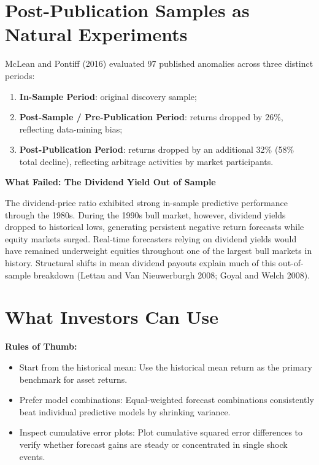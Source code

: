 \section{Post-Publication Samples as Natural Experiments}
\label{sec:05-postpub}

McLean and Pontiff (2016) evaluated 97 published anomalies across three distinct periods:
\begin{enumerate}
  \item \textbf{In-Sample Period}: original discovery sample;
  \item \textbf{Post-Sample / Pre-Publication Period}: returns dropped by 26\%, reflecting data-mining bias;
  \item \textbf{Post-Publication Period}: returns dropped by an additional 32\% (58\% total decline), reflecting arbitrage activities by market participants.
\end{enumerate}

\begin{callout}
\noindent \textbf{What Failed: The Dividend Yield Out of Sample}

The dividend-price ratio exhibited strong in-sample predictive performance through the 1980s. During the 1990s bull market, however, dividend yields dropped to historical lows, generating persistent negative return forecasts while equity markets surged. Real-time forecasters relying on dividend yields would have remained underweight equities throughout one of the largest bull markets in history. Structural shifts in mean dividend payouts explain much of this out-of-sample breakdown (Lettau and Van Nieuwerburgh 2008; Goyal and Welch 2008).
\end{callout}

\section{What Investors Can Use}
\label{sec:05-investors}

\textbf{Rules of Thumb:}
\begin{itemize}
  \item Start from the historical mean: Use the historical mean return as the primary benchmark for asset returns.
  \item Prefer model combinations: Equal-weighted forecast combinations consistently beat individual predictive models by shrinking variance.
  \item Inspect cumulative error plots: Plot cumulative squared error differences to verify whether forecast gains are steady or concentrated in single shock events.
\end{itemize}

